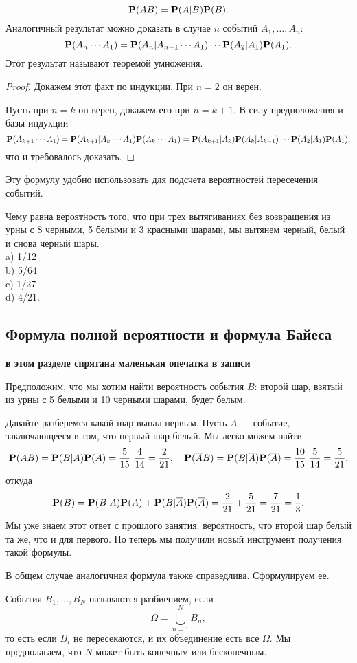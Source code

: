 \documentclass[11 pt,russian]{article}
\begin{document}
$$
{\bf P}(AB) = {\bf P}(A|B) {\bf P}(B).
$$
Аналогичный результат можно доказать в случае $n$ событий $A_1,\dotsc,A_n$:
$$
{\bf P}(A_n \dotsm A_1) = {\bf P}(A_n|A_{n-1}\dotsm A_1) \dotsm {\bf P}(A_2|A_1) {\bf P}(A_1).
$$
Этот результат называют теоремой умножения.
\begin{proof}
Докажем этот факт по индукции. При $n=2$ он верен. 

Пусть при $n=k$ он верен, докажем его при $n=k+1$. В силу предположения и базы индукции
$$
{\bf P}(A_{k+1}\dotsm A_1) = {\bf P}(A_{k+1}|A_k \dotsm A_1) {\bf P}(A_k \dotsm A_1) = {\bf P}(A_{k+1}|A_k) {\bf P}(A_k|A_{k-1}) \dotsm {\bf P}(A_2|A_1) {\bf P}(A_1),
$$
что и требовалось доказать.
\end{proof}
Эту формулу удобно использовать для подсчета вероятностей пересечения событий.
\begin{Que}
Чему равна вероятность того, что при трех вытягиваниях без возвращения из урны с 8 черными, 5 белыми и 3 красными шарами, мы вытянем черный, белый и снова черный шары.\\
a) 1/12\\
b) 5/64\\
c) 1/27\\
d) 4/21.
\end{Que}
\subsection{Формула полной вероятности и формула Байеса}
{\bf в этом разделе спрятана маленькая опечатка в записи}
\begin{Exam}
Предположим, что мы хотим найти вероятность события $B$: второй шар, взятый из урны с 5 белыми и 10 черными шарами, будет белым. 

Давайте разберемся какой шар выпал первым. Пусть $A$ --- событие, заключающееся в том, что первый шар белый. Мы легко можем найти
$$
{\bf P}(A B) = {\bf P}(B|A) {\bf P}(A) = \frac{5}{15}\ \frac{4}{14} = \frac{2}{21},\quad {\bf P}(\overline{A} B) = {\bf P}(B|\overline{A}) {\bf P}(\overline{A}) = \frac{10}{15}\ \frac{5}{14} = \frac{5}{21},
$$
откуда 
$$
{\bf P}(B) = {\bf P}(B|A) {\bf P}(A) + {\bf P}(B|\overline{A}) {\bf P}(\overline{A}) = \frac{2}{21} + \frac{5}{21} = \frac{7}{21}=\frac13.
$$
Мы уже знаем этот ответ с прошлого занятия: вероятность, что второй шар белый та же, что и для первого. Но теперь мы получили новый инструмент получения такой формулы.
\end{Exam}
В общем случае аналогичная формула также справедлива. Сформулируем ее.
\begin{Def}
События $B_1,\dotsc,B_N$ называются разбиением, если 
$$\Omega = \bigcup_{n=1}^{N} B_n,$$
то есть если $B_i$ не пересекаются, и их объединение есть все $\Omega$. Мы предполагаем, что $N$ может быть конечным или бесконечным.
\end{Def}
\end{document}
